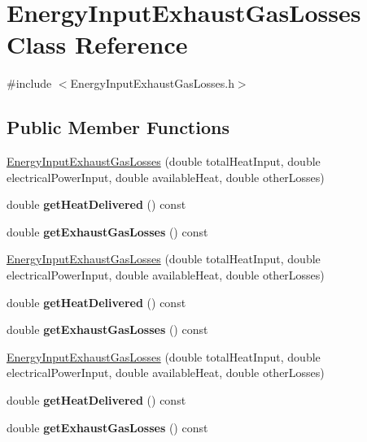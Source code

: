 \hypertarget{class_energy_input_exhaust_gas_losses}{}\section{Energy\+Input\+Exhaust\+Gas\+Losses Class Reference}
\label{class_energy_input_exhaust_gas_losses}


{\ttfamily \#include $<$Energy\+Input\+Exhaust\+Gas\+Losses.\+h$>$}

\subsection*{Public Member Functions}
\begin{DoxyCompactItemize}
\item 
\hyperlink{class_energy_input_exhaust_gas_losses_af415ddb1b676a0a43edbe28d7fc9520c}{Energy\+Input\+Exhaust\+Gas\+Losses} (double total\+Heat\+Input, double electrical\+Power\+Input, double available\+Heat, double other\+Losses)
\item 
\mbox{\label{class_energy_input_exhaust_gas_losses_a139f89d11cb663632ee9ccc27e242b07}} 
double {\bfseries get\+Heat\+Delivered} () const
\item 
\mbox{\label{class_energy_input_exhaust_gas_losses_aff089e129d329769d895e489928eb059}} 
double {\bfseries get\+Exhaust\+Gas\+Losses} () const
\item 
\hyperlink{class_energy_input_exhaust_gas_losses_af415ddb1b676a0a43edbe28d7fc9520c}{Energy\+Input\+Exhaust\+Gas\+Losses} (double total\+Heat\+Input, double electrical\+Power\+Input, double available\+Heat, double other\+Losses)
\item 
\mbox{\label{class_energy_input_exhaust_gas_losses_a139f89d11cb663632ee9ccc27e242b07}} 
double {\bfseries get\+Heat\+Delivered} () const
\item 
\mbox{\label{class_energy_input_exhaust_gas_losses_aff089e129d329769d895e489928eb059}} 
double {\bfseries get\+Exhaust\+Gas\+Losses} () const
\item 
\hyperlink{class_energy_input_exhaust_gas_losses_af415ddb1b676a0a43edbe28d7fc9520c}{Energy\+Input\+Exhaust\+Gas\+Losses} (double total\+Heat\+Input, double electrical\+Power\+Input, double available\+Heat, double other\+Losses)
\item 
\mbox{\label{class_energy_input_exhaust_gas_losses_a139f89d11cb663632ee9ccc27e242b07}} 
double {\bfseries get\+Heat\+Delivered} () const
\item 
\mbox{\label{class_energy_input_exhaust_gas_losses_aff089e129d329769d895e489928eb059}} 
double {\bfseries get\+Exhaust\+Gas\+Losses} () const
\end{DoxyCompactItemize}


